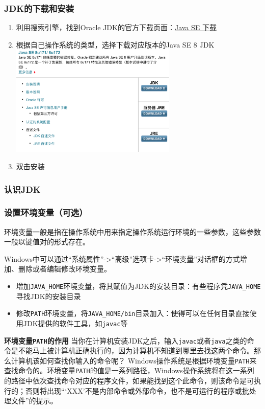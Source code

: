 \begin{frame}
  \frametitle{JDK的下载和安装}
  \begin{enumerate}
    \item 利用搜索引擎，找到Oracle JDK的官方下载页面：\href{http://www.oracle.com/technetwork/cn/java/javase/downloads/index.html}{Java SE 下载}
    \item 根据自己操作系统的类型，选择下载对应版本的Java SE 8 JDK
      \includegraphics[height=150pt]{figures/oracle_jdk_download}
    \item 双击安装
  \end{enumerate}
\end{frame}

\begin{frame}
  \frametitle{认识JDK}
\end{frame}

\begin{frame}
  \frametitle{设置环境变量（可选）}
  环境变量一般是指在操作系统中用来指定操作系统运行环境的一些参数，这些参数一般以键值对的形式存在。
  
  Windows中可以通过“系统属性”->“高级”选项卡->“环境变量”对话框的方式增加、删除或者编辑修改环境变量。
  \begin{itemize}
    \item 增加\texttt{JAVA\_HOME}环境变量，将其赋值为JDK的安装目录：有些程序凭\texttt{JAVA\_HOME}寻找JDK的安装目录
    \item 修改\texttt{PATH}环境变量，将\texttt{JAVA\_HOME/bin}目录加入：使得可以在任何目录直接使用JDK提供的软件工具，如\texttt{javac}等
  \end{itemize}
  
  \begin{block}{\textbf{环境变量\texttt{PATH}的作用}}
    当你在计算机安装JDK之后，输入\texttt{javac}或者\texttt{java}之类的命令是不能马上被计算机正确执行的，因为计算机不知道到哪里去找这两个命令。那么计算机该如何查找你输入的命令呢？ Windows操作系统是根据环境变量\texttt{PATH}来查找命令的。环境变量\texttt{PATH}的值是一系列路径，Windows操作系统将在这一系列的路径中依次查找命令对应的程序文件，如果能找到这个此命令，则该命令是可执行的；否则将出现“‘XXX’不是内部命令或外部命令，也不是可运行的程序或批处理文件”的提示。
  \end{block}
\end{frame}

